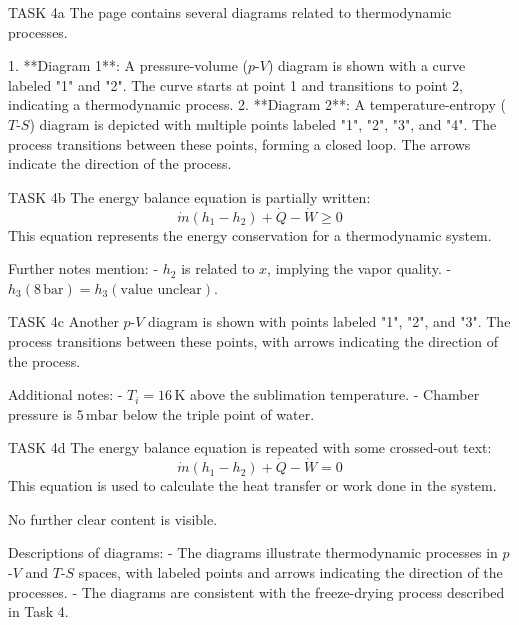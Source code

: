 TASK 4a  
The page contains several diagrams related to thermodynamic processes.  

1. **Diagram 1**: A pressure-volume (\(p\)-\(V\)) diagram is shown with a curve labeled "1" and "2". The curve starts at point 1 and transitions to point 2, indicating a thermodynamic process.  
2. **Diagram 2**: A temperature-entropy (\(T\)-\(S\)) diagram is depicted with multiple points labeled "1", "2", "3", and "4". The process transitions between these points, forming a closed loop. The arrows indicate the direction of the process.  

TASK 4b  
The energy balance equation is partially written:  
\[
\dot{m} (h_1 - h_2) + \dot{Q} - \dot{W} \geq 0
\]  
This equation represents the energy conservation for a thermodynamic system.  

Further notes mention:  
- \(h_2\) is related to \(x\), implying the vapor quality.  
- \(h_3 (8 \, \text{bar}) = h_3 (\text{value unclear})\).  

TASK 4c  
Another \(p\)-\(V\) diagram is shown with points labeled "1", "2", and "3". The process transitions between these points, with arrows indicating the direction of the process.  

Additional notes:  
- \(T_i = 16 \, \text{K}\) above the sublimation temperature.  
- Chamber pressure is \(5 \, \text{mbar}\) below the triple point of water.  

TASK 4d  
The energy balance equation is repeated with some crossed-out text:  
\[
\dot{m} (h_1 - h_2) + \dot{Q} - \dot{W} = 0
\]  
This equation is used to calculate the heat transfer or work done in the system.  

No further clear content is visible.  

Descriptions of diagrams:  
- The diagrams illustrate thermodynamic processes in \(p\)-\(V\) and \(T\)-\(S\) spaces, with labeled points and arrows indicating the direction of the processes.  
- The diagrams are consistent with the freeze-drying process described in Task 4.